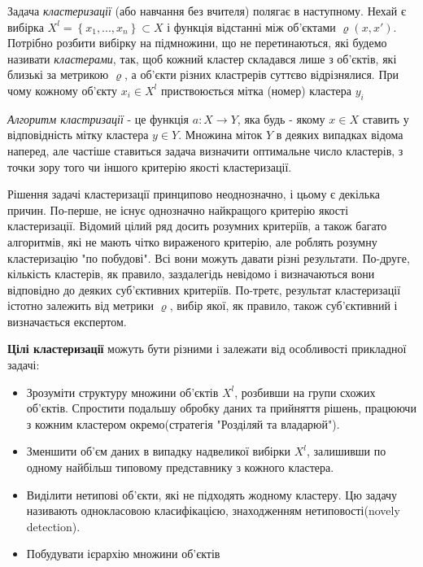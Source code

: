 \documentclass[a4paper,14pt,russian]{extreport}
\begin{document}
Задача \textit{кластеризації} (або навчання без вчителя) полягає в наступному. Нехай є вибірка  $ X^{l}  = \left \{ x_1, ..., x_n \right \} \subset X$  і функція відстанні між об'єктами $ \varrho \left(x, x' \right) $. Потрібно розбити вибірку на підмножини, що не перетинаються, які будемо називати \textit{кластерами}, так, щоб кожний кластер складався лише з об'єктів, які близькі за метрикою  $ \varrho $, а об'єкти різних кластрерів суттєво відрізнялися.  При чому кожному об'єкту $ x_i \in X^{l}  $ приствоюється мітка (номер) кластера $ y_i $ \par
	\textit{Алгоритм кластризації} - це функція $ a : X \to Y $, яка будь - якому $ x \in X $ ставить у відповідність мітку кластера $ y \in Y $. Множина міток $ Y $ в деяких випадках відома наперед, але частіше ставиться задача визначити оптимальне число кластерів, з точки зору того чи іншого критерію якості кластеризації.\par
	Рішення задачі кластеризації принципово неоднозначно, і цьому є
декілька причин. По-перше, не існує однозначно найкращого критерію якості кластеризації. Відомий цілий ряд досить розумних критеріїв, а також
багато алгоритмів, які не мають чітко вираженого критерію, але роблять
розумну кластеризацію "по побудові". Всі вони можуть давати різні результати. По-друге, кількість кластерів, як правило,  заздалегідь невідомо і визначаються вони відповідно до деяких суб'єктивних критеріїв. По-третє, результат кластеризації істотно залежить від метрики
$ \varrho $, вибір якої, як правило,
також суб'єктивний і визначається експертом. \par 
	\textbf{Цілі кластеризації} можуть бути різними і залежати від особливості прикладної задачі:
	\begin{itemize}

		\item Зрозуміти структуру множини об'єктів $ X^{l} $,  розбивши на групи схожих об'єктів. Спростити подальшу обробку даних та прийняття рішень, працюючи з кожним кластером окремо(стратегія "Розділяй та владарюй").
		
		\item Зменшити об'єм даних в випадку надвеликої вибірки $ X^{l} $, залишивши по одному найбільш типовому представнику з кожного кластера.
		
		\item Виділити нетипові об'єкти, які не підходять жодному кластеру. Цю задачу називають однокласовою класифікацією, знаходженням нетиповості(novely detection).
		
		\item Побудувати ієрархію множини об'єктів
		

	\end{itemize}
\end{document}
